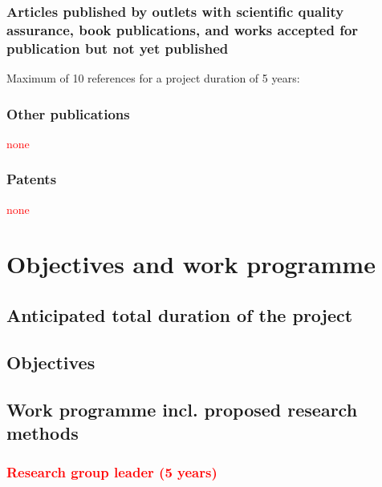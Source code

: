 \documentclass[a4paper,11pt,numbers=noenddot,parskip=half-]{scrreprt}
\begin{document}
\subsubsection{Articles published by outlets with scientific quality assurance, book publications, and works accepted for publication but not yet published}
Maximum of 10 references for a project duration of 5 years:\\
\begin{enumerate}[leftmargin=1.5em,topsep=0pt,itemsep=0.0ex,partopsep=0ex,parsep=0.0ex]
	
\end{enumerate}

\subsubsection{Other publications}
\textcolor{red}{none}

\subsubsection{Patents}
\textcolor{red}{none}

\section{Objectives and work programme}\label{sec:work_prog}
\subsection{Anticipated total duration of the project}
\myblindtext

\subsection{Objectives}\label{sec:work_prog:objectives}
\myblindtext


\subsection{Work programme incl. proposed research methods}
\myblindtext[2]

\subsubsection{\textcolor{red}{Research group leader (5 years)}}
\end{document}
